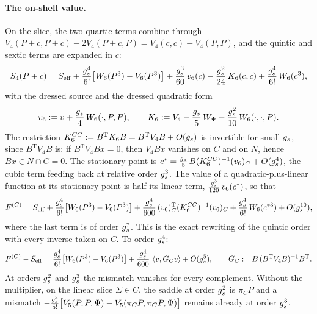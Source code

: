 \paragraph{The on-shell value.}
On the slice, the two quartic terms combine through $V_4(P + c, P + c) - 2 V_4(P + c, P) = V_4(c, c) - V_4(P, P)$, and the quintic and sextic terms are expanded in $c$:
\begin{equation}
  \label{eq:mult:hyb:slice}
  S_4(P + c)
    = S_{\mathrm{eff}}
      + \frac{g_s^4}{6!} \big[ W_6(P^3) - V_6(P^3) \big]
      + \frac{g_s^3}{60} \, v_6(c)
      - \frac{g_s^2}{24} \, K_6(c, c)
      + \frac{g_s^4}{6!} \, W_6(c^3),
\end{equation}
with the dressed source and the dressed quadratic form
\begin{equation}
  v_6
    := v + \frac{g_s}{4} \, W_6(\cdot, P, P),
  \qquad
  K_6
    := V_4 - \frac{g_s}{5} \, W_\Psi - \frac{g_s^2}{10} \, W_6(\cdot, \cdot, P).
\end{equation}
The restriction $K_6^{CC} := B^{\mathrm{T}} K_6 B = B^{\mathrm{T}} V_4 B + O(g_s)$ is invertible for small $g_s$, since $B^{\mathrm{T}} V_4 B$ is: if $B^{\mathrm{T}} V_4 B x = 0$, then $V_4 B x$ vanishes on $C$ and on $N$, hence $B x \in N \cap C = 0$.
The stationary point is $c^* = \frac{g_s}{5} \, B (K_6^{CC})^{-1} (v_6)_C + O(g_s^4)$, the cubic term feeding back at relative order $g_s^3$.
The value of a quadratic-plus-linear function at its stationary point is half its linear term, $\frac{g_s^3}{120} \, v_6(c^*)$, so that
\begin{equation}
  F^{(C)}
    = S_{\mathrm{eff}}
      + \frac{g_s^4}{6!} \big[ W_6(P^3) - V_6(P^3) \big]
      + \frac{g_s^4}{600} \, (v_6)_C^{\mathrm{T}} (K_6^{CC})^{-1} (v_6)_C
      + \frac{g_s^4}{6!} \, W_6(c^{*3})
      + O(g_s^{10}),
\end{equation}
where the last term is of order $g_s^7$.
This is the exact rewriting of the quintic order with every inverse taken on $C$.
To order $g_s^4$:
\begin{equation}
  \label{eq:mult:hyb:mismatch}
  F^{(C)} - S_{\mathrm{eff}}
    = \frac{g_s^4}{6!} \big[ W_6(P^3) - V_6(P^3) \big]
      + \frac{g_s^4}{600} \, \braket{v, G_C v}
      + O(g_s^5),
  \qquad
  G_C
    := B \, (B^{\mathrm{T}} V_4 B)^{-1} B^{\mathrm{T}}.
\end{equation}
At orders $g_s^2$ and $g_s^3$ the mismatch vanishes for every complement.
Without the multiplier, on the linear slice $\Sigma \in C$, the saddle at order $g_s^2$ is $\pi_C P$ and a mismatch $- \frac{g_s^3}{5!} \big[ V_5(P, P, \Psi) - V_5(\pi_C P, \pi_C P, \Psi) \big]$ remains already at order $g_s^3$.

